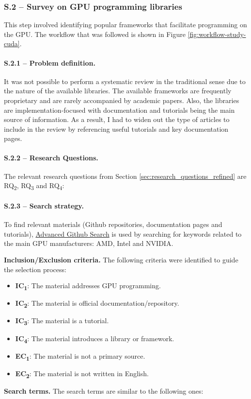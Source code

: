 \subsubsection{S.2 -- Survey on GPU programming libraries}
\label{sec:gpu-programming-libraries}
This step involved identifying popular frameworks that facilitate programming on the GPU. The
workflow that was followed is shown in Figure \ref{fig:workflow-study-cuda}.

\paragraph{S.2.1 -- Problem definition.}
It was not possible to perform a systematic review in the traditional sense due to the nature of
the available libraries. The available frameworks are frequently proprietary and are rarely
accompanied by academic papers. Also, the libraries are implementation-focused with documentation
and tutorials being the main source of information. As a result, I had to widen out the type of
articles to include in the review by referencing useful tutorials and key documentation pages.

\paragraph{S.2.2 -- Research Questions.}
The relevant research questions from Section \ref{sec:research_questions_refined} are
RQ\textsubscript{2}, RQ\textsubscript{3} and RQ\textsubscript{4}:

\paragraph{S.2.3 -- Search strategy.}
To find relevant materials (Github repositories, documentation pages and tutorials),
\href{https://github.com/search/advanced}{Advanced Github Search} is used by searching for keywords
related to the main GPU manufacturers: AMD, Intel and NVIDIA.



\textbf{Inclusion/Exclusion criteria.}
The following criteria were identified to guide the selection process:

\begin{itemize}
	\item \textbf{IC\textsubscript{1}}: The material addresses GPU programming.
	\item \textbf{IC\textsubscript{2}}: The material is official documentation/repository.
	\item \textbf{IC\textsubscript{3}}: The material is a tutorial.
	\item \textbf{IC\textsubscript{4}}: The material introduces a library or framework. \\
	\item \textbf{EC\textsubscript{1}}: The material is not a primary source.
	\item \textbf{EC\textsubscript{2}}: The material is not written in English.
\end{itemize}

\textbf{Search terms.}
The search terms are similar to the following ones:

